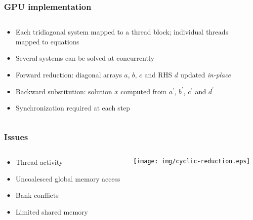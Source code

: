 \begin{frame}
\frametitle{GPU implementation}
\begin{columns}
\begin{column}{0.5\textwidth}
\begin{itemize}
\item Each tridiagonal system mapped to a thread block;
    individual threads mapped to equations
\item Several systems can be solved at concurrently
\item Forward reduction: diagonal arrays $a$, $b$, $c$ and RHS $d$
    updated \emph{in-place}
\item Backward substitution: solution $x$ computed
    from $a^\prime$, $b^\prime$, $c^\prime$ and $d^\prime$
\item Synchronization required at each step
\end{itemize}
\end{column}
\begin{column}{0.5\textwidth}

\end{column}
\end{columns}
\end{frame}

\begin{frame}
\frametitle{Issues}
\begin{columns}
\begin{column}{0.5\textwidth}
\begin{itemize}
    \item Thread activity
    \item Uncoalesced global memory access
    \item Bank conflicts
    \item Limited shared memory
\end{itemize}
\end{column}
\begin{column}{0.5\textwidth}
\texttt{[image: img/cyclic-reduction.eps]}
\end{column}
\end{columns}
\end{frame}

